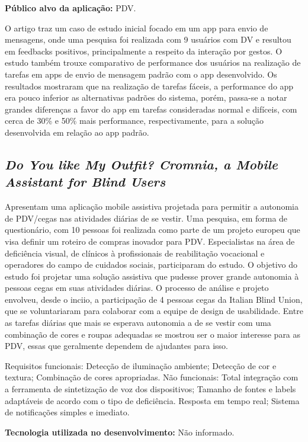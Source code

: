 \textbf{Público alvo da aplicação:} PDV\@.

O artigo traz um caso de estudo inicial focado em um app para envio de mensagens, onde uma pesquisa foi realizada com 9 usuários com DV e resultou em feedbacks positivos, principalmente a respeito da interação por gestos.
O estudo também trouxe comparativo de performance dos usuários na realização de tarefas em apps de envio de mensagem padrão com o app desenvolvido.
Os resultados mostraram que na realização de tarefas fáceis, a performance do app era pouco inferior as alternativas padrões do sistema, porém, passa-se a notar grandes diferenças a favor do app em tarefas consideradas normal e difíceis, com cerca de 30\% e 50\% mais performance, respectivamente, para a solução desenvolvida em relação ao app padrão.

\subsection{\emph{Do You like My Outfit? Cromnia, a Mobile Assistant for Blind Users}}

Apresentam uma aplicação mobile assistiva projetada para permitir a autonomia de PDV/cegas nas atividades diárias de se vestir.
Uma pesquisa, em forma de questionário, com 10 pessoas foi realizada como parte de um projeto europeu que visa definir um roteiro de compras inovador para PDV.
Especialistas na área de deficiência visual, de clínicos à profissionais de reabilitação vocacional e operadores do campo de cuidados sociais, participaram do estudo.
O objetivo do estudo foi projetar uma solução assistiva que pudesse prover grande autonomia à pessoas cegas em suas atividades diárias.
O processo de análise e projeto envolveu, desde o inciio, a participação de 4 pessoas cegas da Italian Blind Union, que se voluntariaram para colaborar com a equipe de design de usabilidade.
Entre as tarefas diárias que mais se esperava autonomia a de se vestir com uma combinação de cores e roupas adequadas se mostrou ser o maior interesse para as PDV, essas que geralmente dependem de ajudantes para isso.

Requisitos funcionais:
Detecção de iluminação ambiente;
Detecção de cor e textura;
Combinação de cores apropriadas.
Não funcionais:
Total integração com a ferramenta de sintetização de voz dos dispositivos;
Tamanho de fontes e labels adaptáveis de acordo com o tipo de deficiência.
Resposta em tempo real;
Sistema de notificações simples e imediato.

\textbf{Tecnologia utilizada no desenvolvimento:} Não informado.

